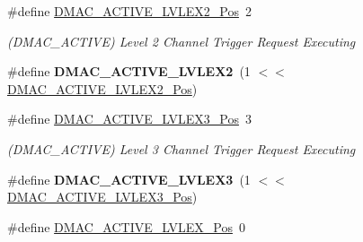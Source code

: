 \begin{DoxyCompactItemize}
\item 
\hypertarget{group___s_a_m_l21___d_m_a_c_gae9d306951ab4862119c4016a7d722c17}{}\#define \hyperlink{group___s_a_m_l21___d_m_a_c_gae9d306951ab4862119c4016a7d722c17}{D\+M\+A\+C\+\_\+\+A\+C\+T\+I\+V\+E\+\_\+\+L\+V\+L\+E\+X2\+\_\+\+Pos}~2\label{group___s_a_m_l21___d_m_a_c_gae9d306951ab4862119c4016a7d722c17}

\begin{DoxyCompactList}\small\item\em (D\+M\+A\+C\+\_\+\+A\+C\+T\+I\+V\+E) Level 2 Channel Trigger Request Executing \end{DoxyCompactList}\item 
\hypertarget{group___s_a_m_l21___d_m_a_c_ga71fa8a341bb1b2afad8ee28263ceca54}{}\#define {\bfseries D\+M\+A\+C\+\_\+\+A\+C\+T\+I\+V\+E\+\_\+\+L\+V\+L\+E\+X2}~(1 $<$$<$ \hyperlink{group___s_a_m_l21___d_m_a_c_gae9d306951ab4862119c4016a7d722c17}{D\+M\+A\+C\+\_\+\+A\+C\+T\+I\+V\+E\+\_\+\+L\+V\+L\+E\+X2\+\_\+\+Pos})\label{group___s_a_m_l21___d_m_a_c_ga71fa8a341bb1b2afad8ee28263ceca54}

\item 
\hypertarget{group___s_a_m_l21___d_m_a_c_gae26f46dc2736d41954454a101227df9a}{}\#define \hyperlink{group___s_a_m_l21___d_m_a_c_gae26f46dc2736d41954454a101227df9a}{D\+M\+A\+C\+\_\+\+A\+C\+T\+I\+V\+E\+\_\+\+L\+V\+L\+E\+X3\+\_\+\+Pos}~3\label{group___s_a_m_l21___d_m_a_c_gae26f46dc2736d41954454a101227df9a}

\begin{DoxyCompactList}\small\item\em (D\+M\+A\+C\+\_\+\+A\+C\+T\+I\+V\+E) Level 3 Channel Trigger Request Executing \end{DoxyCompactList}\item 
\hypertarget{group___s_a_m_l21___d_m_a_c_ga571edcaf14a9365b0d4676f0a8971d34}{}\#define {\bfseries D\+M\+A\+C\+\_\+\+A\+C\+T\+I\+V\+E\+\_\+\+L\+V\+L\+E\+X3}~(1 $<$$<$ \hyperlink{group___s_a_m_l21___d_m_a_c_gae26f46dc2736d41954454a101227df9a}{D\+M\+A\+C\+\_\+\+A\+C\+T\+I\+V\+E\+\_\+\+L\+V\+L\+E\+X3\+\_\+\+Pos})\label{group___s_a_m_l21___d_m_a_c_ga571edcaf14a9365b0d4676f0a8971d34}

\item 
\hypertarget{group___s_a_m_l21___d_m_a_c_gac5780abfdb6bb43d0c84efa5f2bce1f8}{}\#define \hyperlink{group___s_a_m_l21___d_m_a_c_gac5780abfdb6bb43d0c84efa5f2bce1f8}{D\+M\+A\+C\+\_\+\+A\+C\+T\+I\+V\+E\+\_\+\+L\+V\+L\+E\+X\+\_\+\+Pos}~0\label{group___s_a_m_l21___d_m_a_c_gac5780abfdb6bb43d0c84efa5f2bce1f8}


\end{DoxyCompactItemize}
